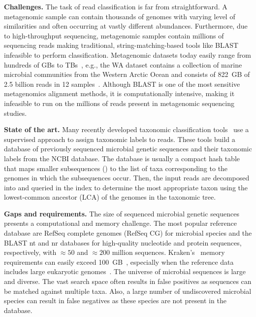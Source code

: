 \noindent
\textbf{Challenges.}
The task of read classification is far from straightforward.
A metagenomic sample can contain thousands of genomes with varying level of similarities and often occurring at vastly different abundances. Furthermore, due to high-throughput sequencing, metagenomic samples contain millions of sequencing reads making traditional, string-matching-based tools like BLAST~\cite{altschul1990basic} infeasible to perform classification. Metagenomic datasets today easily range from hundreds of GBs to TBs~\cite{hofmeyr2020terabase}, e.g., the WA dataset contains a collection of marine microbial communities from the Western Arctic Ocean and consists of 822~GB of 2.5 billion reads in 12 samples~\cite{hofmeyr2020terabase}.
%
Although BLAST is one of the most sensitive metagenomics alignment methods, it is computationally intensive, making it infeasible to run on the millions of reads present in metagenomic sequencing studies.

\noindent
\textbf{State of the art.}
Many recently developed taxonomic classification tools~\cite{ames2013scalable, kim2016centrifuge, menzel2016fast, wood2014kraken, wood2019improved, dilthey2019strain,liu2018novel} use a supervised approach to assign taxonomic labels to reads.
These tools build a database of previously sequenced microbial genetic sequences and their taxonomic labels from the NCBI database.
The database is usually a compact hash table that maps smaller subsequences (\kmers) to the list of taxa corresponding to the genomes in which the subsequences occur.
Then, the input reads are decomposed into \kmers and queried in the index to determine the most appropriate taxon using the lowest-common ancestor (LCA) of the genomes in the taxonomic tree.

\noindent
\textbf{Gaps and requirements.}
The size of sequenced microbial genetic sequences presents a computational and memory challenge.
The most popular reference database are RefSeq complete genomes (RefSeq CG) for microbial species and the BLAST nt and nr databases for high-quality nucleotide and protein sequences, respectively, with $\approx50$ and $\approx200$ million sequences.
Kraken's~\cite{wood2014kraken} memory requirements can easily exceed 100~GB~\cite{simon2019benchmarking}, especially when the reference data includes large eukaryotic genomes~\cite{meiser2017sequencing, knutson2017porcine}.
%
The universe of microbial sequences is large and diverse. The vast search space often results in false positives as sequences can be matched against multiple taxa. Also, a large number of undiscovered microbial species can result in false negatives as these species are not present in the database.

